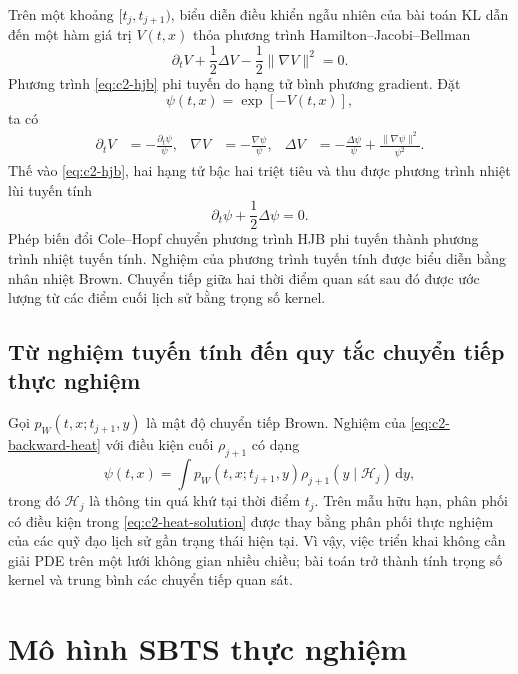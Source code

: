 Trên một khoảng $[t_j,t_{j+1})$, biểu diễn điều khiển ngẫu nhiên của bài toán
KL dẫn đến một hàm giá trị $V(t,x)$ thỏa phương trình Hamilton--Jacobi--Bellman
\begin{equation}
    \partial_t V+\frac12\Delta V-\frac12\|\nabla V\|^2=0.
    \label{eq:c2-hjb}
\end{equation}
Phương trình \eqref{eq:c2-hjb} phi tuyến do hạng tử bình phương gradient. Đặt
\begin{equation}
    \psi(t,x)=\exp[-V(t,x)],
    \label{eq:c2-cole-hopf}
\end{equation}
ta có
\begin{align*}
    \partial_t V&=-\frac{\partial_t\psi}{\psi},
    &\nabla V&=-\frac{\nabla\psi}{\psi},
    &\Delta V&=-\frac{\Delta\psi}{\psi}
      +\frac{\|\nabla\psi\|^2}{\psi^2}.
\end{align*}
Thế vào \eqref{eq:c2-hjb}, hai hạng tử bậc hai triệt tiêu và thu được phương
trình nhiệt lùi tuyến tính
\begin{equation}
    \partial_t\psi+\frac12\Delta\psi=0.
    \label{eq:c2-backward-heat}
\end{equation}
Phép biến đổi Cole--Hopf chuyển phương trình HJB phi tuyến thành phương trình
nhiệt tuyến tính. Nghiệm của phương trình tuyến tính được biểu diễn bằng nhân
nhiệt Brown. Chuyển tiếp giữa hai thời điểm quan sát sau đó được ước lượng từ
các điểm cuối lịch sử bằng trọng số kernel.

\subsection{Từ nghiệm tuyến tính đến quy tắc chuyển tiếp thực nghiệm}

Gọi $p_W(t,x;t_{j+1},y)$ là mật độ chuyển tiếp Brown. Nghiệm của
\eqref{eq:c2-backward-heat} với điều kiện cuối $\rho_{j+1}$ có dạng
\begin{equation}
    \psi(t,x)
    =\int p_W(t,x;t_{j+1},y)\rho_{j+1}(y\mid\mathcal{H}_j)\,\mathrm{d}y,
    \label{eq:c2-heat-solution}
\end{equation}
trong đó $\mathcal{H}_j$ là thông tin quá khứ tại thời điểm $t_j$. Trên mẫu hữu
hạn, phân phối có điều kiện trong \eqref{eq:c2-heat-solution} được thay bằng
phân phối thực nghiệm của các quỹ đạo lịch sử gần trạng thái hiện tại. Vì vậy,
việc triển khai không cần giải PDE trên một lưới không gian nhiều chiều; bài
toán trở thành tính trọng số kernel và trung bình các chuyển tiếp quan sát.

\section{Mô hình SBTS thực nghiệm}
\label{sec:c2-sbts}

